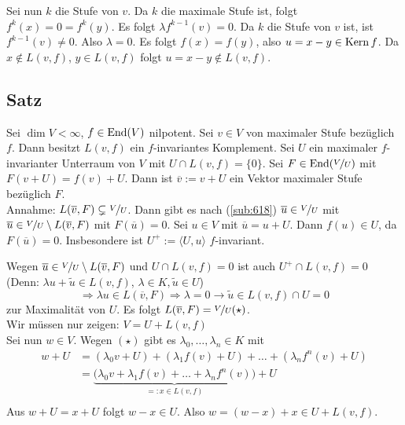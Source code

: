 Sei nun $k$ die Stufe von $v$. Da $k$ die maximale Stufe ist, folgt $f^k(x)= 0 = f^k(y)$.
Es folgt $\lambda  f^{k-1}(v)= 0$. Da $k$ die Stufe von $v$ ist, ist $f^{k-1}(v) \not= 0$. Also $\lambda =0$. Es folgt $f(x)=f(y)$, also $u=x-y \in \operatorname{Kern} f$.
Da $x \not\in L(v,f)$, $y \in L(v,f)$ folgt $u=x-y \not\in L(v,f)$. \bewende

\subsection[Satz über $L(v,f)$ eines $v$ mit maximaler Stufe]{Satz} %
\label{sub:619}
Sei $\dim V < \infty$, $f \in \operatorname{End}(V)$ nilpotent. Sei $v \in V$ von maximaler Stufe bezüglich $f$. Dann besitzt $L(v,f)$ ein $f$-invariantes Komplement.
Sei $U$ ein maximaler $f$-invarianter Unterraum von $V$ mit $U \cap L(v,f)= \{0\}$. Sei $F \in \operatorname{End}(\nicefrac{V}{U})$ mit $F(v+U)= f(v)+U$. Dann ist 
$\overline{v} := v+ U$ ein Vektor maximaler Stufe bezüglich $F$. \\
Annahme: $L(\overline{v},F ) \subsetneq \nicefrac{V}{U}$. Dann gibt es nach (\ref{sub:618}) $\overline{u} \in \nicefrac{V}{U}$ mit 
$\overline{u} \in \nicefrac{V}{U} \setminus L(\overline{v}, F)$ mit $F(\overline{u})=0$. Sei $u \in V$ mit $\overline{u}= u +U$. Dann $f(u) \in U$, da $F(\overline{u})=0$.
Insbesondere ist $U^+ := \langle U,u \rangle$ $f$-invariant.

Wegen $\overline{u} \in \nicefrac{V}{U} \setminus L(\overline{v},F ) $ und $U \cap L(v,f)=0$ ist auch $U^+ \cap L(v,f)= 0$ 
(Denn: $\lambda u + \tilde u \in L(v,f)$, $\lambda  \in K, \tilde u \in U$) \\
\[
	\Rightarrow  \lambda u \in L(\overline{v},F ) \Rightarrow \lambda =0 \rightarrow \tilde u \in L(v,f) \cap U =0
\]
\light zur Maximalität von $U$. Es folgt $L(\overline{v}, F ) = \nicefrac{V}{U} (\star)$.\\
Wir müssen nur zeigen: $V=U + L(v,f)$ \\
Sei nun $w \in V$. Wegen $(\star)$ gibt es $\lambda_0, \ldots , \lambda_n \in K$ mit 
\begin{align*}
	w+U &= (\lambda_0 v + U)+ (\lambda_1 f(v) + U) + \ldots + (\lambda_n f^n (v) + U) \\
	&= \underbrace{\Big(\lambda_0 v + \lambda_1 f(v) + \ldots  + \lambda_n f^n(v)\Big)}_{=: x \in L(v,f)} + U \\
\end{align*}
Aus $w+U= x +U$ folgt $w-x \in U$. Also $w=(w-x)+ x \in U+ L(v,f)$. \bewende

